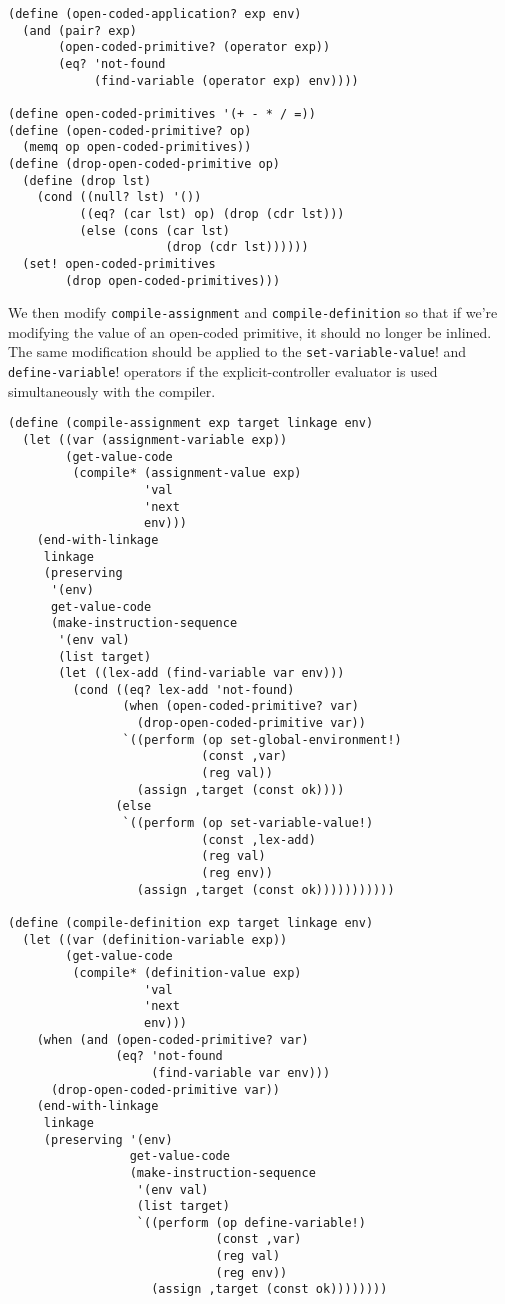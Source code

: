 \documentclass[a4paper,12pt]{article}
\begin{document}
\begin{lstlisting}
(define (open-coded-application? exp env)
  (and (pair? exp)
       (open-coded-primitive? (operator exp))
       (eq? 'not-found
            (find-variable (operator exp) env))))

(define open-coded-primitives '(+ - * / =))
(define (open-coded-primitive? op)
  (memq op open-coded-primitives))
(define (drop-open-coded-primitive op)
  (define (drop lst)
    (cond ((null? lst) '())
          ((eq? (car lst) op) (drop (cdr lst)))
          (else (cons (car lst)
                      (drop (cdr lst))))))
  (set! open-coded-primitives
        (drop open-coded-primitives)))
\end{lstlisting}

We then modify \lstinline!compile-assignment! and
\lstinline!compile-definition!  so that if we're modifying the value
of an open-coded primitive, it should no longer be inlined.  The
same modification should be applied to the
\lstinline!set-variable-value!! and \lstinline!define-variable!!
operators if the explicit-controller evaluator is used simultaneously
with the compiler.

\begin{lstlisting}
(define (compile-assignment exp target linkage env)
  (let ((var (assignment-variable exp))
        (get-value-code
         (compile* (assignment-value exp)
                   'val
                   'next
                   env)))
    (end-with-linkage
     linkage
     (preserving
      '(env)
      get-value-code
      (make-instruction-sequence
       '(env val)
       (list target)
       (let ((lex-add (find-variable var env)))
         (cond ((eq? lex-add 'not-found)
                (when (open-coded-primitive? var)
                  (drop-open-coded-primitive var))
                `((perform (op set-global-environment!)
                           (const ,var)
                           (reg val))
                  (assign ,target (const ok))))
               (else
                `((perform (op set-variable-value!)
                           (const ,lex-add)
                           (reg val)
                           (reg env))
                  (assign ,target (const ok)))))))))))

(define (compile-definition exp target linkage env)
  (let ((var (definition-variable exp))
        (get-value-code
         (compile* (definition-value exp)
                   'val
                   'next
                   env)))
    (when (and (open-coded-primitive? var)
               (eq? 'not-found
                    (find-variable var env)))
      (drop-open-coded-primitive var))
    (end-with-linkage
     linkage
     (preserving '(env)
                 get-value-code
                 (make-instruction-sequence
                  '(env val)
                  (list target)
                  `((perform (op define-variable!)
                             (const ,var)
                             (reg val)
                             (reg env))
                    (assign ,target (const ok))))))))
\end{lstlisting}
\end{document}
